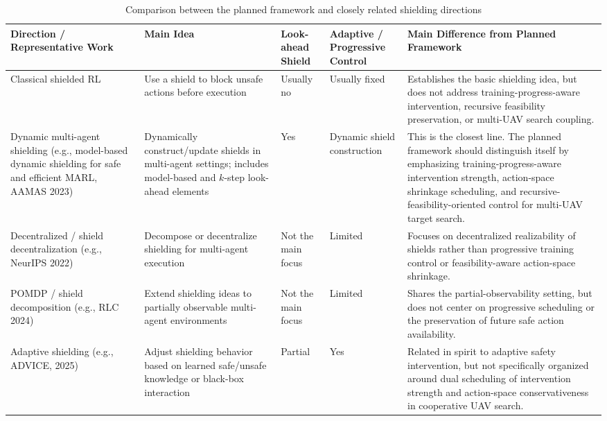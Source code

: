 \documentclass[11pt]{article}
\begin{document}
\begin{table}[htbp]
\centering
\caption{Comparison between the planned framework and closely related shielding directions}
\label{tab:related-work-comparison}
\renewcommand{\arraystretch}{1.15}
\begin{tabularx}{\textwidth}{>{\raggedright\arraybackslash}p{3.0cm} >{\raggedright\arraybackslash}p{3.1cm} >{\raggedright\arraybackslash}p{2.2cm} >{\raggedright\arraybackslash}p{2.2cm} >{\raggedright\arraybackslash}X}
\toprule
\textbf{Direction / Representative Work} & \textbf{Main Idea} & \textbf{Look-ahead Shield} & \textbf{Adaptive / Progressive Control} & \textbf{Main Difference from Planned Framework} \\
\midrule
Classical shielded RL & Use a shield to block unsafe actions before execution & Usually no & Usually fixed & Establishes the basic shielding idea, but does not address training-progress-aware intervention, recursive feasibility preservation, or multi-UAV search coupling. \\

Dynamic multi-agent shielding \newline (e.g., model-based dynamic shielding for safe and efficient MARL, AAMAS 2023) & Dynamically construct/update shields in multi-agent settings; includes model-based and $k$-step look-ahead elements & Yes & Dynamic shield construction & This is the closest line. The planned framework should distinguish itself by emphasizing training-progress-aware intervention strength, action-space shrinkage scheduling, and recursive-feasibility-oriented control for multi-UAV target search. \\

Decentralized / shield decentralization \newline (e.g., NeurIPS 2022) & Decompose or decentralize shielding for multi-agent execution & Not the main focus & Limited & Focuses on decentralized realizability of shields rather than progressive training control or feasibility-aware action-space shrinkage. \\

POMDP / shield decomposition \newline (e.g., RLC 2024) & Extend shielding ideas to partially observable multi-agent environments & Not the main focus & Limited & Shares the partial-observability setting, but does not center on progressive scheduling or the preservation of future safe action availability. \\

Adaptive shielding \newline (e.g., ADVICE, 2025) & Adjust shielding behavior based on learned safe/unsafe knowledge or black-box interaction & Partial & Yes & Related in spirit to adaptive safety intervention, but not specifically organized around dual scheduling of intervention strength and action-space conservativeness in cooperative UAV search. \\


\end{tabularx}
\end{table}
\end{document}
